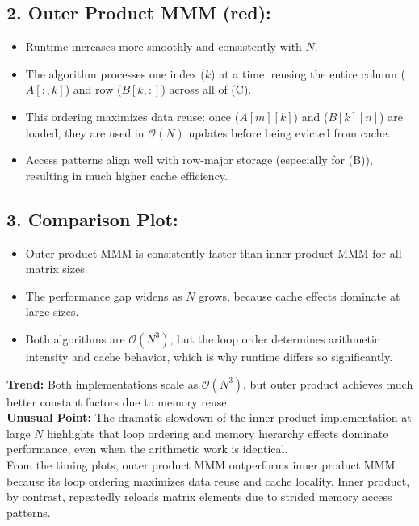 \documentclass[a4 paper]{article}
\begin{document}
\subsection*{2. Outer Product MMM (red):}
\begin{itemize}[noitemsep]
    \item Runtime increases more smoothly and consistently with $N$.
    \item The algorithm processes one index ($k$) at a time, reusing the entire column ($A[:,k]$) and row ($B[k,:]$) across all of (C).
    \item This ordering maximizes data reuse: once ($A[m][k]$) and ($B[k][n]$) are loaded, they are used in $\mathcal{O}(N)$ updates before being evicted from cache.
    \item Access patterns align well with row-major storage (especially for (B)), resulting in much higher cache efficiency.
\end{itemize}

\subsection*{3. Comparison Plot:}
\begin{itemize}[noitemsep]
    \item Outer product MMM is consistently faster than inner product MMM for all matrix sizes.
    \item The performance gap widens as $N$ grows, because cache effects dominate at large sizes.
    \item Both algorithms are $\mathcal{O}(N^3)$, but the loop order determines arithmetic intensity and cache behavior, which is why runtime differs so significantly.
\end{itemize}


\noindent\textbf{Trend:} Both implementations scale as $\mathcal{O}(N^3)$, but outer product achieves much better constant factors due to memory reuse.  \\


\noindent\textbf{Unusual Point:} The dramatic slowdown of the inner product implementation at large $N$ highlights that loop ordering and memory hierarchy effects dominate performance, even when the arithmetic work is identical.  \\

\noindent From the timing plots, outer product MMM outperforms inner product MMM because its loop ordering maximizes data reuse and cache locality. Inner product, by contrast, repeatedly reloads matrix elements due to strided memory access patterns.  
\end{document}
